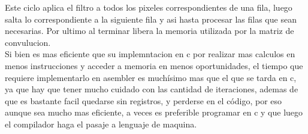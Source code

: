 Este ciclo aplica el filtro a todos los pixeles correspondientes de una fila, luego salta lo correspondiente a la siguiente fila y asi hasta procesar las filas que sean necesarias. Por ultimo al terminar libera la memoria utilizada por la matriz de convulucion. \\
Si bien es mas eficiente que su implemntacion en c por realizar mas calculos en menos instrucciones y acceder a memoria en menos oportunidades, el tiempo que requiere implementarlo en asembler es muchísimo mas que el que se tarda en c, ya que hay que tener mucho cuidado con las cantidad de iteraciones, ademas de que es bastante facil quedarse sin registros, y perderse en el código, por eso aunque sea mucho mas eficiente, a veces es preferible programar en c y que luego el compilador haga el pasaje a lenguaje de maquina. \\